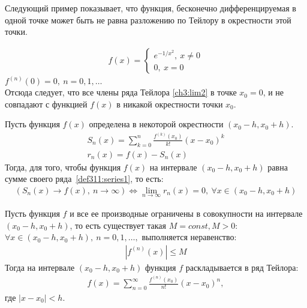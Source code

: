 Следующий пример показывает, что функция, бесконечно дифференцируемая в одной
точке может быть не равна разложению по Тейлору в окрестности этой точки.

\begin{example}
  \begin{gather*}
    f(x) =
    \begin{cases}
      e^{-1/x^2}, \ x \not = 0 \\
      0, \ x = 0
    \end{cases}
  \end{gather*}
  $f^{(n)}(0) = 0, \ n = 0, 1, \dots$ \\
  Отсюда следует, что все члены ряда Тейлора \eqref{ch3:lim2} в точке $x_0 = 0$,
  и не совпадают с функцией $f(x)$ в никакой окрестности точки $x_0$.
\end{example}

\begin{approval}
  \label{app331}
  Пусть функция $f(x)$ определена в некоторой окрестности $(x_0 - h, x_0 + h)$.
  \begin{gather}
    S_n(x) = \sum\limits_{k = 0}^{n} \frac{f^{(k)}(x_0)}{k!} (x - x_0)^k
    \label{app331:sum1} \\
    r_n(x) = f(x) - S_n(x) \label{app331:term1}
  \end{gather}
  Тогда, для того, чтобы функция $f(x)$ на интервале $(x_0 - h, x_0 + h)$ равна
  сумме своего ряда~\eqref{def311:series1}, то есть:
  \begin{gather}
    (S_n(x) \to f(x), \ n \to \infty) \Longleftrightarrow \lim\limits_{n \to
    \infty} r_n(x) = 0, \ \forall x \in (x_0 - h, x_0 + h)
    \label{app331:lim1}
  \end{gather}
\end{approval}

\begin{theorem}
  \label{th331}
  Пусть функция $f$ и все ее производные ограничены в совокупности на интервале
  $(x_0 - h, x_0 + h)$, то есть существует такая $M = const, M > 0$: \\$\forall
  x \in (x_0 - h, x_0 + h), \ n = 0, 1, \dots, $ выполняется неравенство:
  \begin{gather}
    |f^{(n)}(x)| \leq M \label{th331:uneq1}
  \end{gather}
  Тогда на интервале $(x_0 - h, x_0 + h)$ функция $f$ раскладывается в ряд
  Тейлора:
  \begin{gather}
    f(x) = \sum\limits_{n = 0}^{\infty} \frac{f^{(n)}(x_0)}{n!} (x - x_0)^n,
    \label{th331:series1}
  \end{gather}
  где $|x - x_0| < h$.
\end{theorem}

